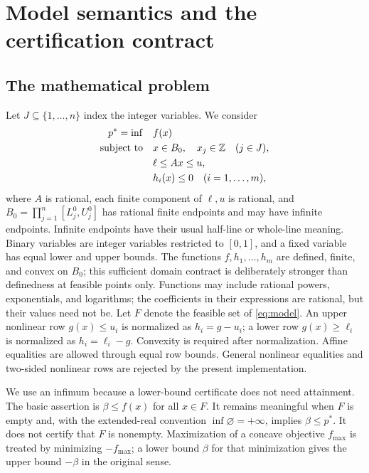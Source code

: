 \section{Model semantics and the certification contract}
\label{sec:model}
\subsection{The mathematical problem}
Let $J\subseteq\{1,\ldots,n\}$ index the integer variables. We consider
\begin{equation}
\begin{aligned}
  p^* = \inf\quad & f(x)\\
  \text{subject to}\quad & x\in B_0,\quad x_j\in\mathbb{Z}\quad(j\in J),\\
  & \ell\leq Ax\leq u,\\
  & h_i(x)\leq 0\quad(i=1,\ldots,m),
\end{aligned}
\label{eq:model}
\end{equation}
where $A$ is rational, each finite component of $\ell,u$ is rational, and
$B_0=\prod_{j=1}^n[L_j^0,U_j^0]$ has rational finite endpoints and may have infinite endpoints. Infinite endpoints have their usual half-line or whole-line meaning. Binary variables are integer variables restricted to $[0,1]$, and a fixed variable has equal lower and upper bounds. The functions $f,h_1,\ldots,h_m$ are defined, finite, and convex on $B_0$; this sufficient domain contract is deliberately stronger than definedness at feasible points only. Functions may include rational powers, exponentials, and logarithms; the coefficients in their expressions are rational, but their values need not be. Let $F$ denote the feasible set of \eqref{eq:model}. An upper nonlinear row $g(x)\leq u_i$ is normalized as $h_i=g-u_i$; a lower row $g(x)\geq\ell_i$ is normalized as $h_i=\ell_i-g$. Convexity is required after normalization. Affine equalities are allowed through equal row bounds. General nonlinear equalities and two-sided nonlinear rows are rejected by the present implementation.

We use an infimum because a lower-bound certificate does not need attainment. The basic assertion is $\beta\leq f(x)$ for all $x\in F$. It remains meaningful when $F$ is empty and, with the extended-real convention $\inf\varnothing=+\infty$, implies $\beta\leq p^*$. It does not certify that $F$ is nonempty. Maximization of a concave objective $f_{\max}$ is treated by minimizing $-f_{\max}$; a lower bound $\beta$ for that minimization gives the upper bound $-\beta$ in the original sense.

